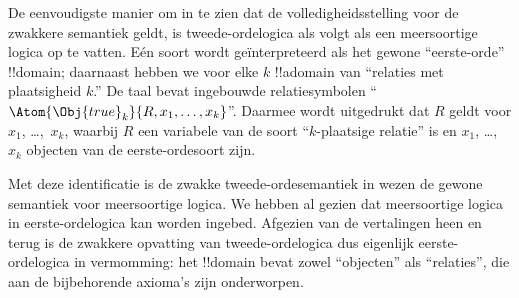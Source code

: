 \documentclass[../../../include/open-logic-section]{subfiles}
\begin{document}
De eenvoudigste manier om in te zien dat de volledigheidsstelling voor de
zwakkere semantiek geldt, is tweede-ordelogica als volgt als een meersoortige
logica op te vatten. Eén soort wordt geïnterpreteerd als het gewone
``eerste-orde'' !!{domain}; daarnaast hebben we voor elke $k$ !!a{domain} van
``relaties met plaatsigheid $k$.'' De taal bevat ingebouwde relatiesymbolen
``$\Atom{\Obj{true}_k}{R,x_1,\dots,x_k}$''. Daarmee wordt uitgedrukt dat $R$
geldt voor $x_1$, \dots,~$x_k$, waarbij $R$ een variabele van de soort
``$k$-plaatsige relatie'' is en $x_1$, \dots,~$x_k$ objecten van de
eerste-ordesoort zijn.

Met deze identificatie is de zwakke tweede-ordesemantiek in wezen de gewone
semantiek voor meersoortige logica. We hebben al gezien dat meersoortige
logica in eerste-ordelogica kan worden ingebed. Afgezien van de vertalingen
heen en terug is de zwakkere opvatting van tweede-ordelogica dus eigenlijk
eerste-ordelogica in vermomming: het !!{domain} bevat zowel ``objecten'' als
``relaties'', die aan de bijbehorende axioma's zijn onderworpen.
\end{document}
